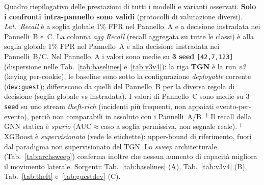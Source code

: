 \documentclass[11pt,a4paper]{report}
\begin{document}
\begin{table}[ht!]
\caption{Quadro riepilogativo delle prestazioni di tutti i modelli e varianti osservati. \textbf{Solo i confronti intra-pannello sono validi} (protocolli di valutazione diversi). \textit{Lat.\ Recall} è a soglia globale 1\% FPR nel Pannello~A e a decisione instradata nei Pannelli~B e~C. La colonna \textit{agg Recall} (recall aggregata su tutte le classi) è alla soglia globale 1\% FPR nel Pannello~A e alla decisione instradata nei Pannelli~B/C. Nel Pannello~A i valori sono medie su \textbf{3 seed} \texttt{[42,7,123]} (dispersione nelle Tab.~\ref{tab:baselines} e~\ref{tab:v3v4}): la riga \textbf{TGN} è la run \emph{v3} (keying per-cookie), le baseline sono sotto la configurazione \emph{deployable} corrente (\texttt{dev:guest}); differiscono da quelli del Pannello~B per la diversa regola di decisione (soglia globale vs instradata). I valori di Pannello~C sono medie su 3 \texttt{seed} su uno stream \emph{theft-rich} (incidenti più frequenti, non appaiati evento-per-evento), perciò non comparabili in assoluto con i Pannelli~A/B. $^{\dagger}$ Il recall della GNN statica è \emph{spurio} (AUC$\approx$caso a soglia permissiva, non segnale reale). $^{\ddagger}$ XGBoost è \emph{supervisionato} (vede le etichette): upper-bound di riferimento, fuori dal paradigma non supervisionato del TGN. Lo \textit{sweep} architetturale (Tab.~\ref{tab:archsweep}) conferma inoltre che nessun aumento di capacità migliora il movimento laterale. Sorgenti: Tab.~\ref{tab:baselines} (A), Tab.~\ref{tab:v3v4} (B), Tab.~\ref{tab:theft} e~\ref{tab:guestdev} (C).}
\label{tab:summary}
\end{table}
\end{document}
